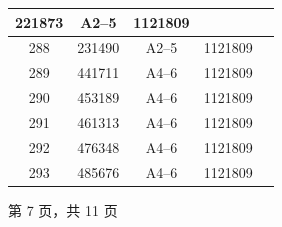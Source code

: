 \documentclass[UTF8,10pt,a4paper,fontset=fandol]{ctexart}
\newcommand{\fieldvalue}[1]{#1}
\begin{document}
\begin{tabular}{|c|c|c|c|p{2.5cm}|}
\fieldvalue{221873} &
\fieldvalue{A2--5} &
\fieldvalue{1121809} & \\
\hline
\fieldvalue{288} &
\fieldvalue{231490} &
\fieldvalue{A2--5} &
\fieldvalue{1121809} & \\
\hline
\fieldvalue{289} &
\fieldvalue{441711} &
\fieldvalue{A4--6} &
\fieldvalue{1121809} & \\
\hline
\fieldvalue{290} &
\fieldvalue{453189} &
\fieldvalue{A4--6} &
\fieldvalue{1121809} & \\
\hline
\fieldvalue{291} &
\fieldvalue{461313} &
\fieldvalue{A4--6} &
\fieldvalue{1121809} & \\
\hline
\fieldvalue{292} &
\fieldvalue{476348} &
\fieldvalue{A4--6} &
\fieldvalue{1121809} & \\
\hline
\fieldvalue{293} &
\fieldvalue{485676} &
\fieldvalue{A4--6} &
\fieldvalue{1121809} & \\
\hline
\end{tabular}

\vfill
\begin{center}
第 7 页，共 11 页
\end{center}
\end{document}
